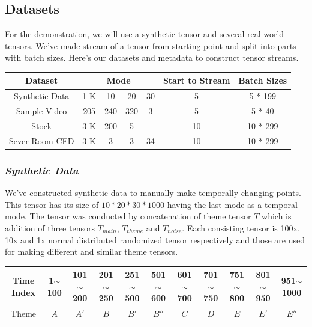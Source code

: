 

\subsection{Datasets}
For the demonstration, we will use a synthetic tensor and several real-world tensors. We've made stream of a tensor from starting point and split into parts with batch sizes. Here's our datasets and metadata to construct tensor streams.

\begin{table}[htb]
	\small
	\centering
	\begin{tabular}{ c | cccccc }
		\hline
		\textbf{Dataset} & \multicolumn{4}{c}{\textbf{Mode}} & \textbf{Start to Stream} & \textbf{Batch Sizes} \\
		\hline
 		Synthetic Data & 1 K & 10 & 20 & 30 & 5 & 5 * 199\\
 		Sample Video & 205 & 240 & 320 & 3 & 5 & 5 * 40\\
 		Stock & 3 K & 200 & 5 & & 10 & 10 * 299 \\
 		Sever Room CFD & 3 K & 3 & 3 & 34 & 10 & 10 * 299 \\
		\hline
	\end{tabular}
\end{table}

\subsubsection{\em Synthetic Data}
We've constructed synthetic data to manually make temporally changing points. This tensor has its size of $10*20*30*1000$ having the last mode as a temporal mode. The tensor was conducted by concatenation of theme tensor $T$ which is addition of three tensors $T_{main}$, $T_{theme}$ and $T_{noise}$. Each consisting tensor is 100x, 10x and 1x normal distributed randomized tensor respectively and those are used for making different and similar theme tensors.

\begin{table}[htb]
	\small
	\begin{tabular}{ c | cccccccccc }
 		\hline
 		Time Index & 1$\sim$100 & 101$\sim$200 & 201$\sim$250 & 251$\sim$500 & 501$\sim$600 & 601$\sim$700 & 701$\sim$750 & 751$\sim$800 & 801$\sim$950 & 951$\sim$1000 \\
 		\hline
 		Theme & $A$ & $A'$ & $B$ & $B'$ & $B''$ & $C$ & $D$ & $E$ & $E'$ & $E''$ \\
 		\hline
	\end{tabular}
\end{table}

